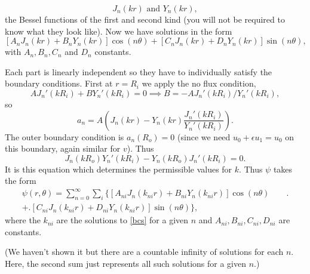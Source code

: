 \documentclass[a4paper, 12pt]{article}
\begin{document}
\begin{enumerate}[label={\bf \arabic{*}.\;}, ref={\arabic{*}},itemsep=3ex, left=0ex]
{\begin{enumerate}[label=(\alph*)]
{            \begin{equation}
              J_n(kr) \mbox{ and } Y_n(k r),
            \end{equation}
            the Bessel functions of the first and second kind (you will not be required to know what they look like). Now we have solutions in the form
            \begin{equation}
              \left[A_n J_n(k r) + B_n Y_n(k r)\right]\cos(n\theta) +  \left[C_n J_n(k r) + D_n Y_n(k r)\right]\sin(n\theta),
            \end{equation}
            with $A_n, B_n, C_n$ and $D_n$ constants.

            Each part is linearly independent so they have to individually satisfy the boundary conditions. First at $r = R_i$ we apply the no flux condition,
            \begin{equation}
              \label{beseq}
              A J_n'(kR_i) + B Y_n'(kR_i) = 0\implies B = -AJ_n'(kR_i)/Y_n'(kR_i),
            \end{equation}
            so
            \begin{equation}
              a_n = A\left(J_n(k r)-Y_n(k r)\frac{J_n'(kR_i)}{Y_n'(kR_i)}\right).
            \end{equation}
            The outer boundary condition is $a_n(R_o) = 0$ (since we need $u_0 +\epsilon u_1 = u_0$ on this boundary, again similar for $v$). Thus
            \begin{equation}
              \label{bcs}
              J_n(k R_o)Y_n'(kR_i) - Y_n(k R_o) J_n'(k R_i)= 0.
            \end{equation}
            It is this equation which determines the permissible values for $k$. Thus $\psi$ takes the form
            \begin{align}
              \psi(r,\theta) = \sum_{n=0}^{\infty}\sum_{i}\bigl\{\left[A_{ni} J_n(k_{ni} r) + B_{ni} Y_n(k_{ni} r)\right]\cos(n\theta) \nonumber \qquad\bigr.\\
              + \bigl.\left[C_{ni} J_n(k_{ni} r) + D_{ni} Y_n(k_{ni} r)\right]\sin(n\theta)\bigr\},
            \end{align}
            where the $k_{ni}$ are the solutions to \cref{bcs} for a given $n$ and $A_{ni},B_{ni},C_{ni},D_{ni}$ are constants.

            (We haven't shown it but there are a countable infinity of solutions for each $n$. Here, the second sum just represents all such solutions for a given $n$.)

}
\end{enumerate}}
\end{enumerate}
\end{document}
